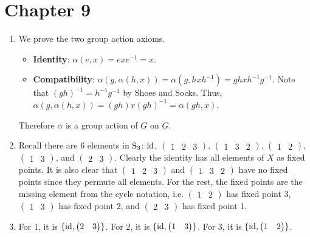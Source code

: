\section*{Chapter 9}
\begin{enumerate}
    \item We prove the two group action axioms.
    \begin{itemize}
        \item \textbf{Identity}: $\alpha(e, x) = exe^{-1} = x$.
        \item \textbf{Compatibility}: $\alpha(g, \alpha(h, x)) = \alpha(g, hxh^{-1}) = ghxh^{-1}g^{-1}$. Note that $(gh)^{-1} = h^{-1}g^{-1}$ by Shoes and Socks. Thus, $\alpha(g, \alpha(h, x)) = (gh)x(gh)^{-1} = \alpha(gh, x)$.
    \end{itemize}
    Therefore $\alpha$ is a group action of $G$ on $G$.

    \item Recall there are 6 elements in $\mathrm{S}_{3}$: $\mathrm{id}$, $\begin{pmatrix}1 & 2 & 3\end{pmatrix}$, $\begin{pmatrix}1 & 3 & 2\end{pmatrix}$, $\begin{pmatrix}1 & 2\end{pmatrix}$, $\begin{pmatrix}1 & 3\end{pmatrix}$, and $\begin{pmatrix}2 & 3\end{pmatrix}$. Clearly the identity has all elements of $X$ as fixed points. It is also clear that $\begin{pmatrix}1 & 2 & 3\end{pmatrix}$ and $\begin{pmatrix}1 & 3 & 2\end{pmatrix}$ have no fixed points since they permute all elements. For the rest, the fixed points are the missing element from the cycle notation, i.e. $\begin{pmatrix}1 & 2\end{pmatrix}$ has fixed point 3, $\begin{pmatrix}1 & 3\end{pmatrix}$ has fixed point 2, and $\begin{pmatrix}2 & 3\end{pmatrix}$ has fixed point 1.

    \item For 1, it is $\{\mathrm{id}, \begin{pmatrix}2 & 3\end{pmatrix}\}$. For 2, it is $\{\mathrm{id}, \begin{pmatrix}1 & 3\end{pmatrix}\}$. For 3, it is $\{\mathrm{id}, \begin{pmatrix}1 & 2\end{pmatrix}\}$.


\end{enumerate}

